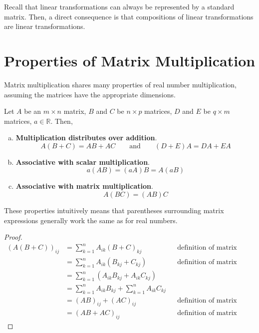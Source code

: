 \documentclass[letterpaper,12pt]{article}
\begin{document}
Recall that linear transformations can always be represented by a standard matrix. Then, a direct consequence is that compositions of linear transformations are linear transformations.

\section*{Properties of Matrix Multiplication}
Matrix multiplication shares many properties of real number multiplication, assuming the matrices have the appropriate dimensions.

\begin{theorem}
Let $A$ be an $m \times n$ matrix, $B$ and $C$ be $n \times p$ matrices, $D$ and $E$ be $q \times m$ matrices, $a \in \mathbb{R}$. Then,
\begin{enumerate}[(a)]
    \item \textbf{Multiplication distributes over addition}.
    \begin{equation*}
        A(B + C) = AB + AC \qquad \text{and} \qquad (D + E)A = DA + EA
    \end{equation*}
    \item \textbf{Associative with scalar multiplication}.
    \begin{equation*}
        a(AB) = (aA)B = A(aB)
    \end{equation*}
    \item \textbf{Associative with matrix multiplication}.
    \begin{equation*}
        A(BC) = (AB)C
    \end{equation*}
\end{enumerate}
\end{theorem}

These properties intuitively means that parentheses surrounding matrix expressions generally work the same as for real numbers.

\begin{proof}
\begin{align*}
    (A(B + C))_{ij} & = \sum_{k=1}^n A_{ik}(B + C)_{kj} && \text{definition of matrix multiplication} \\
    & = \sum_{k=1}^n A_{ik}(B_{kj} + C_{kj}) && \text{definition of matrix addition} \\
    & = \sum_{k=1}^n (A_{ik} B_{kj} + A_{ik} C_{kj}) \\
    & = \sum_{k=1}^n A_{ik}B_{kj} + \sum_{k=1}^n A_{ik}C_{kj} \\
    & = (AB)_{ij} + (AC)_{ij} && \text{definition of matrix multiplication} \\
    & = (AB + AC)_{ij} && \text{definition of matrix addition}
\end{align*}
\end{proof}
\end{document}
